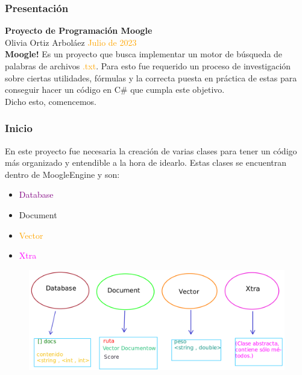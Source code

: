 \documentclass{beamer}
\begin{document}
\lstset{basicstyle = small, breaklines=true, captionpos=b}

    \begin{frame}
        \frametitle{Presentación}
        \Huge\textbf{Proyecto de Programación Moogle}\\
\textcolor{ningen_banzai}{\large Olivia Ortiz Arboláez}
\textcolor{orange}{\tiny Julio de 2023}\\

\vspace{10 pt}
\Large \textcolor{azulft}{\textbf{Moogle!}} Es un proyecto que busca implementar un motor de búsqueda de palabras de archivos \textcolor{orange}{.txt}.
Para esto fue requerido un proceso de investigación sobre ciertas utilidades, fórmulas y la correcta puesta en práctica de estas para conseguir hacer un código en C\# que cumpla este objetivo.\\
\vspace{5 pt}
Dicho esto, comencemos.

    \end{frame}

\begin{frame}
    \frametitle{Inicio}
    \Large En este proyecto fue necesaria la creación de varias clases para tener un código más organizado y entendible a la hora de idearlo. Estas clases se encuentran dentro de MoogleEngine y son:
    \begin{itemize}
        \item \textcolor{purple}{Database}
        \item \textcolor{green!80!black}{Document}
        \item \textcolor{orange}{Vector}
        \item \textcolor{magenta}{Xtra}
    \end{itemize}

\end{frame}

\begin{frame}

    \begin{figure}
        \includegraphics[width = 10 cm , height=6 cm]{./captura1.jpg}
    \end{figure}


\end{frame}
\end{document}
